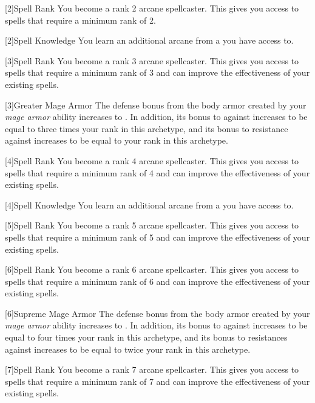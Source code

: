         [2]{Spell Rank} You become a rank 2 arcane spellcaster.
        This gives you access to spells that require a minimum rank of 2.

        [2]{Spell Knowledge} You learn an additional arcane  from a  you have access to.

        [3]{Spell Rank} You become a rank 3 arcane spellcaster.
        This gives you access to spells that require a minimum rank of 3 and can improve the effectiveness of your existing spells.

        [3]{Greater Mage Armor}
        The defense bonus from the body armor created by your \textit{mage armor} ability increases to .
        In addition, its bonus to  against  increases to be equal to three times your rank in this archetype, and its bonus to resistance against  increases to be equal to your rank in this archetype.

        [4]{Spell Rank} You become a rank 4 arcane spellcaster.
        This gives you access to spells that require a minimum rank of 4 and can improve the effectiveness of your existing spells.

        [4]{Spell Knowledge} You learn an additional arcane  from a  you have access to.

        [5]{Spell Rank} You become a rank 5 arcane spellcaster.
        This gives you access to spells that require a minimum rank of 5 and can improve the effectiveness of your existing spells.

        [6]{Spell Rank} You become a rank 6 arcane spellcaster.
        This gives you access to spells that require a minimum rank of 6 and can improve the effectiveness of your existing spells.

        [6]{Supreme Mage Armor}
        The defense bonus from the body armor created by your \textit{mage armor} ability increases to .
        In addition, its bonus to  against  increases to be equal to four times your rank in this archetype, and its bonus to resistances against  increases to be equal to twice your rank in this archetype.

        [7]{Spell Rank} You become a rank 7 arcane spellcaster.
        This gives you access to spells that require a minimum rank of 7 and can improve the effectiveness of your existing spells.

